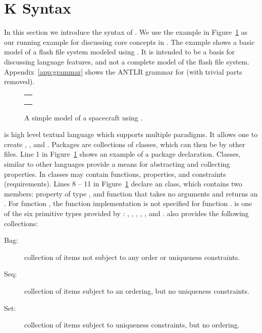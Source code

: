 \section{K Syntax}
\label{sec:k-syntax}

In this section we introduce the syntax of \Klang{}. We use the
\Klang{} example in Figure~\ref{fig:fs} as our running example for
discussing core concepts in \Klang{}. The example shows a basic model
of a flash file system modeled using \Klang{}. It is intended to be a
basis for discussing language features, and not a complete model of
the flash file system. Appendix~\ref{app:grammar} shows the ANTLR
grammar for \Klang{} (with trivial parts removed).

\begin{figure}
\centering
\begin{tabular}{c}
\hline \\
 \\ \\
\hline
\end{tabular}
\caption{A simple model of a spacecraft using \Klang{}.}
\label{fig:fs}
\end{figure}

\Klang{} is high level textual language which supports multiple
paradigms. It allows one to create , ,
and . Packages are collections of classes, which can
then be  by other \Klang{} files. Line 1 in
Figure~\ref{fig:fs} shows an example of a package
declaration. Classes, similar to other languages provide a means for
abstracting and collecting properties. In \Klang{} classes may contain
functions, properties, and constraints (requirements). Lines 8 -- 11
in Figure~\ref{fig:fs} declare an  class, which contains
two members: property  of type , and function
 that takes no arguments and returns an . For
function , the function implementation is not specified for
function .  is one of the six primitive types
provided by \Klang{}: , , ,
, , and . \Klang{} also provides
the following collections:

\begin{description}
\item [Bag:] collection of items not subject to any order
  or uniqueness constraints.
\item [Seq:] collection of items subject to an ordering, but
  no uniqueness constraints.
\item [Set:] collection of items subject to uniqueness
  constraints, but no ordering.
\end{description}

